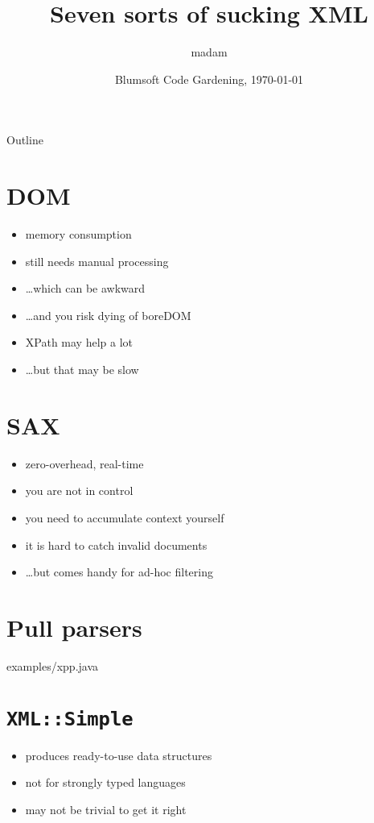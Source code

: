 \documentclass{beamer}
\title{Seven sorts of sucking XML}
\author{madam}
\date{Blumsoft Code Gardening, \today}
\def\Piss{\item[\lower.5ex\hbox{\XSolidBrush}]}
\def\Yeah{\item[\Checkmark]}
\begin{document}
\begin{frame}
	\titlepage
\end{frame}

\begin{frame}{Outline}
	\tableofcontents
\end{frame}

\section{DOM}

\begin{frame}
\begin{itemize}
\Piss	memory consumption
\Piss	still needs manual processing
\Piss	\dots which can be awkward
\Piss	\dots and you risk dying of \alert{bore}DOM
\Yeah	XPath may help a lot
\Piss	\dots but that may be slow
\end{itemize}
\end{frame}

\section{SAX}

\begin{frame}
\begin{itemize}
\Yeah	zero-overhead, real-time
\Piss	you are not in control
\Piss	you need to accumulate context yourself
\Piss	it is hard to catch invalid documents
\Yeah	\dots but comes handy for ad-hoc filtering
\end{itemize}
\end{frame}

\section{Pull parsers}

\begin{frame}[fragile]

	{examples/xpp.java}
\end{frame}

\section{\texttt{XML::Simple}}

\begin{frame}
\begin{itemize}
\Yeah	produces ready-to-use data structures
\Piss	not for strongly typed languages
\Piss	may not be trivial to get it right
\end{itemize}
\end{frame}
\end{document}
